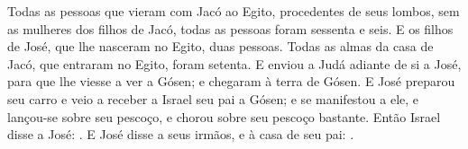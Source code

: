 {{  Todas as pessoas que vieram com Jacó ao Egito, procedentes de seus lombos, sem as mulheres dos filhos de Jacó, todas as pessoas foram sessenta e seis.
  E os filhos de José, que lhe nasceram no Egito, duas pessoas. Todas as almas da casa de Jacó, que entraram no Egito, foram setenta.
  E enviou a Judá adiante de si a José, para que lhe viesse a ver a Gósen; e chegaram à terra de Gósen.
  E José preparou seu carro e veio a receber a Israel seu pai a Gósen; e se manifestou a ele, e lançou-se sobre seu pescoço, e chorou sobre seu pescoço bastante.
  Então Israel disse a José: .
  E José disse a seus irmãos, e à casa de seu pai: .
\par }

}
